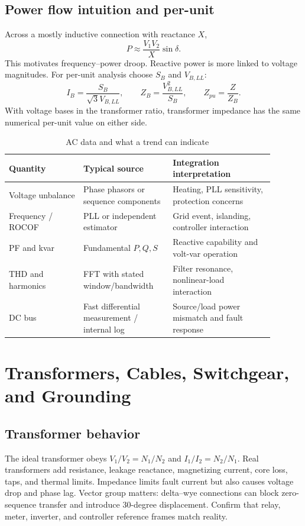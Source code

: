 \documentclass[11pt]{article}
\begin{document}
\subsection{Power flow intuition and per-unit}
Across a mostly inductive connection with reactance $X$,
\[
P\approx\frac{V_1V_2}{X}\sin\delta.
\]
This motivates frequency--power droop. Reactive power is more linked to voltage
magnitudes. For per-unit analysis choose $S_B$ and $V_{B,LL}$:
\[
I_B=\frac{S_B}{\sqrt3V_{B,LL}},\qquad Z_B=\frac{V_{B,LL}^2}{S_B},\qquad
Z_{pu}=\frac{Z}{Z_B}.
\]
With voltage bases in the transformer ratio, transformer impedance has the same
numerical per-unit value on either side.

\begin{table}[h]
\centering
\caption{AC data and what a trend can indicate}
\begin{tabular}{p{0.25\linewidth}p{0.30\linewidth}p{0.34\linewidth}}
\toprule
Quantity & Typical source & Integration interpretation \\
\midrule
Voltage unbalance & Phase phasors or sequence components & Heating, PLL sensitivity, protection concerns \\
Frequency / ROCOF & PLL or independent estimator & Grid event, islanding, controller interaction \\
PF and kvar & Fundamental $P,Q,S$ & Reactive capability and volt-var operation \\
THD and harmonics & FFT with stated window/bandwidth & Filter resonance, nonlinear-load interaction \\
DC bus & Fast differential measurement / internal log & Source/load power mismatch and fault response \\
\bottomrule
\end{tabular}
\end{table}

\section{Transformers, Cables, Switchgear, and Grounding}

\subsection{Transformer behavior}
The ideal transformer obeys $V_1/V_2=N_1/N_2$ and $I_1/I_2=N_2/N_1$.
Real transformers add resistance, leakage reactance, magnetizing current,
core loss, taps, and thermal limits. Impedance limits fault current but also
causes voltage drop and phase lag. Vector group matters: delta--wye connections
can block zero-sequence transfer and introduce 30-degree displacement. Confirm
that relay, meter, inverter, and controller reference frames match reality.
\end{document}
